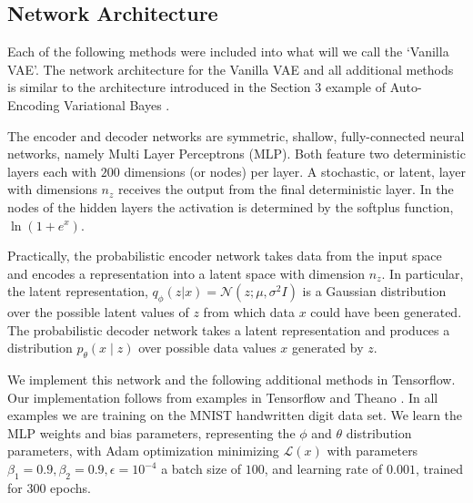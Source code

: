 \documentclass{article} %
\numberwithin{figure}{section}
\renewcommand{\L}{\mathcal{L}}
\begin{document}
\subsection{Network Architecture}
Each of the following methods were included into what will we call the `Vanilla VAE'. The network architecture for the Vanilla VAE and all additional methods is similar to the architecture introduced in the Section $3$ example of Auto-Encoding Variational Bayes \cite{Kingma2013}.
\par The encoder and decoder networks are symmetric, shallow, fully-connected neural networks, namely Multi Layer Perceptrons (MLP). Both feature two deterministic layers each with $200$ dimensions (or nodes) per layer. A stochastic, or latent, layer with dimensions $n_z$ receives the output from the final deterministic layer.  In the nodes of the hidden layers the activation is determined by the softplus function, $\ln{\left(1+e^x\right)}$.
\par Practically, the probabilistic encoder network takes data from the input space and encodes a representation into a latent space with dimension $n_z$. In particular, the latent representation, $q_\phi(z|x)=\mathcal{N}(z;\mu,\sigma^2 I)$ is a Gaussian distribution over the possible latent values of $z$ from which data $x$ could have been generated. The probabilistic decoder network takes a latent representation and produces a distribution ${p_\theta(x\mid z)}$ over possible data values $x$ generated by $z$.
\par We implement this network and the following additional methods in Tensorflow. Our implementation follows from examples in Tensorflow and Theano \cite{Sonderby2016,Metzen2015,Ahuja}. In all examples we are training on the MNIST handwritten digit data set. We learn the MLP weights and bias parameters, representing the $\phi$ and $\theta$ distribution parameters, with Adam optimization minimizing $\L(x)$ with parameters $\beta_1 = 0.9, \beta_2 = 0.9, \epsilon = 10^{-4}$ a batch size of $100$, and learning rate of $0.001$, trained for $300$ epochs.
\end{document}
